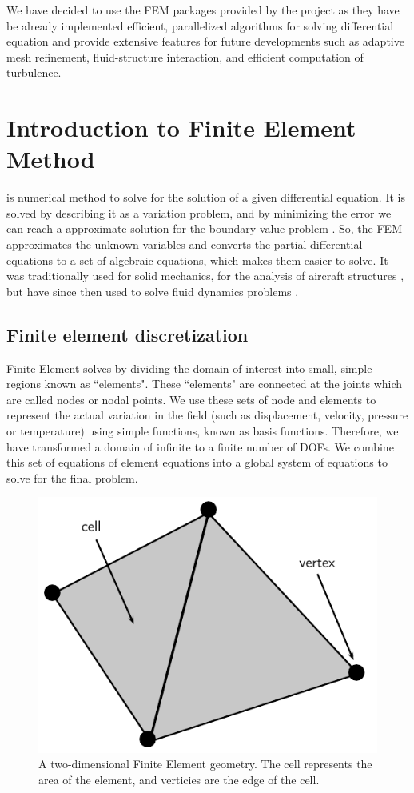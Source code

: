 We have decided to use the FEM packages provided by the \fenics project as they have be already implemented efficient, parallelized algorithms for solving differential equation and provide extensive features for future developments such as adaptive mesh refinement, fluid-structure interaction, and efficient computation of turbulence.

\section{Introduction to Finite Element Method}

 is numerical method to solve for the solution of a given differential equation. It is solved by describing it as a variation problem, and by minimizing the error we can reach a approximate solution for the boundary value problem \cite{Brenner2008}. So, the FEM approximates the unknown variables and converts the partial differential equations to a set of algebraic equations, which makes them easier to solve. It was traditionally used for solid mechanics, for the analysis of aircraft structures \cite{Rao2005}, but have since then used to solve fluid dynamics problems \cite{Guermond2006} \cite{Johnston2004} \cite{Guermond2003}.

\subsection*{Finite element discretization}

Finite Element solves by dividing the domain of interest into small, simple regions known as ``elements". These ``elements" are connected at the joints which are called nodes or nodal points. We use these sets of node and elements to represent the actual variation in the field (such as displacement, velocity, pressure or temperature) using simple functions, known as basis functions. Therefore, we have transformed a domain of infinite  to a finite number of DOFs. We combine this set of equations of element equations into a global system of equations to solve for the final problem.

	\begin{figure}[b]
	\centering
	\includegraphics[width=0.4\linewidth]{./figures/eulerian/finiteElementDefinitions.pdf}
	\caption{A two-dimensional Finite Element geometry. The cell represents the area of the element, and verticies are the edge of the cell.}
	\label{fig:finiteElementDefinitions}
	\end{figure}

